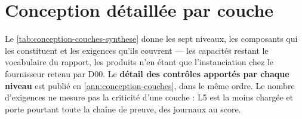 \section{Conception détaillée par couche}
\label{sec:conception-couches}

Le \cref{tab:conception-couches-synthese} donne les sept niveaux, les composants qui les
constituent et les exigences qu'ils couvrent --- les capacités restant le vocabulaire du rapport,
les produits n'en étant que l'instanciation chez le fournisseur retenu par D00. Le
\textbf{détail des contrôles apportés par chaque niveau} est publié en
\cref{ann:conception-couches}, dans le même ordre. Le nombre d'exigences ne mesure pas la
criticité d'une couche : L5 est la moins chargée et porte pourtant toute la chaîne de preuve, des
journaux au score.

\begingroup
\setlength{\tabcolsep}{3pt}
\renewcommand{\arraystretch}{1.0}
